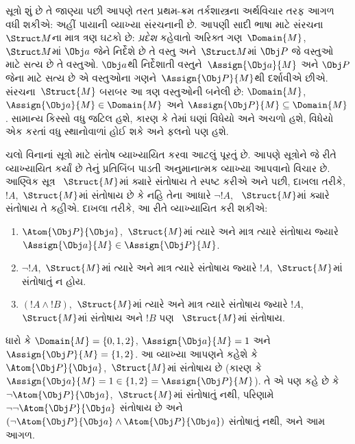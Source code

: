 \begingroup
\makeatletter{}\makeatother


\label{guunit:OLP-0143}


સૂત્રો શું છે તે જાણ્યા પછી આપણે તરત પ્રથમ-ક્રમ તર્કશાસ્ત્રના
અર્થવિચાર તરફ આગળ વધી શકીએ: અહીં પાયાની વ્યાખ્યા સંરચનાની
છે. આપણી સાદી ભાષા માટે સંરચના~$\Struct M$ના માત્ર ત્રણ ઘટકો
છે: \emph{પ્રદેશ} કહેવાતો અરિક્ત ગણ~$\Domain{M}$,
~$\Struct M$માં $\Obj a$ જેને નિર્દેશે છે તે વસ્તુ અને~$\Struct M$માં
$\Obj P$ જે વસ્તુઓ માટે સત્ય છે તે વસ્તુઓ. $\Obj a$થી નિર્દેશાતી
વસ્તુને~$\Assign{\Obj a}{M}$ અને $\Obj P$ જેના માટે સત્ય છે એ
વસ્તુઓના ગણને~$\Assign{\Obj P}{M}$થી દર્શાવીએ છીએ.
સંરચના~$\Struct{M}$ બરાબર આ ત્રણ વસ્તુઓની બનેલી છે:
$\Domain{M}$, $\Assign{\Obj a}{M} \in \Domain{M}$ અને
$\Assign{\Obj P}{M} \subseteq \Domain{M}$. સામાન્ય કિસ્સો વધુ જટિલ
હશે, કારણ કે તેમાં ઘણાં વિધેયો અને અચળો હશે,
વિધેયો એક કરતાં વધુ સ્થાનોવાળાં હોઈ શકે અને ફલનો પણ
હશે.

ચલો વિનાનાં સૂત્રો માટે સંતોષ વ્યાખ્યાયિત કરવા આટલું
પૂરતું છે. આપણે સૂત્રોને જે રીતે વ્યાખ્યાયિત કર્યાં છે તેનું
પ્રતિબિંબ પાડતી અનુમાનાત્મક વ્યાખ્યા આપવાનો વિચાર છે. આણ્વિક સૂત્ર
~$\Struct{M}$માં ક્યારે સંતોષાય તે સ્પષ્ટ કરીએ અને પછી, દાખલા તરીકે,
$!A$,~$\Struct{M}$માં સંતોષાય છે કે નહિ તેના આધારે $\lnot !A$,
~$\Struct{M}$માં ક્યારે સંતોષાય તે કહીએ. દાખલા તરીકે, આ રીતે
વ્યાખ્યાયિત કરી શકીએ:
\begin{enumerate}
  \item $\Atom{\Obj P}{\Obj a}$,~$\Struct{M}$માં ત્યારે અને માત્ર
  ત્યારે સંતોષાય જ્યારે $\Assign{\Obj a}{M} \in \Assign{\Obj P}{M}$.
  \item $\lnot !A$,~$\Struct{M}$માં ત્યારે અને માત્ર ત્યારે સંતોષાય
  જ્યારે $!A$,~$\Struct{M}$માં સંતોષાતું ન હોય.
  \item $(!A \land !B)$,~$\Struct{M}$માં ત્યારે અને માત્ર ત્યારે
  સંતોષાય જ્યારે $!A$,~$\Struct{M}$માં સંતોષાય અને $!B$ પણ
  ~$\Struct{M}$માં સંતોષાય.
\end{enumerate}
ધારો કે $\Domain{M} = \{0, 1, 2\}$, $\Assign{\Obj a}{M} = 1$ અને
$\Assign{\Obj P}{M} = \{1, 2\}$. આ વ્યાખ્યા આપણને કહેશે કે
$\Atom{\Obj P}{\Obj a}$,~$\Struct{M}$માં સંતોષાય છે (કારણ કે
$\Assign{\Obj a}{M} = 1 \in \{1,2\} = \Assign{\Obj P}{M}$). તે એ પણ
કહે છે કે $\lnot \Atom{\Obj P}{\Obj a}$,~$\Struct{M}$માં સંતોષાતું
નથી, પરિણામે $\lnot\lnot \Atom{\Obj P}{\Obj a}$ સંતોષાય છે અને
$(\lnot \Atom{\Obj P}{\Obj a} \land \Atom{\Obj P}{\Obj a})$
સંતોષાતું નથી, અને આમ આગળ.

